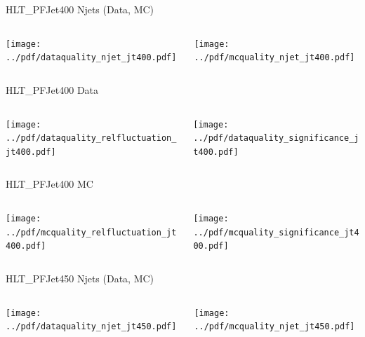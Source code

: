 \documentclass[9pt]{beamer}
\begin{document}
\begin{frame}[t]{HLT\_PFJet400 Njets (Data, MC)}
\begin{columns}[T]
  \begin{column}{.5\textwidth}
  \texttt{[image: ../pdf/dataquality\_njet\_jt400.pdf]}
  \end{column}
  \begin{column}{.5\textwidth}
  \texttt{[image: ../pdf/mcquality\_njet\_jt400.pdf]}
  \end{column}
\end{columns}
\end{frame}

\begin{frame}[t]{HLT\_PFJet400 Data}
\begin{columns}[T]
  \begin{column}{.5\textwidth}
  \texttt{[image: ../pdf/dataquality\_relfluctuation\_jt400.pdf]}
  \end{column}
  \begin{column}{.5\textwidth}
  \texttt{[image: ../pdf/dataquality\_significance\_jt400.pdf]}
  \end{column}
\end{columns}
\end{frame}

\begin{frame}[t]{HLT\_PFJet400 MC}
\begin{columns}[T]
  \begin{column}{.5\textwidth}
  \texttt{[image: ../pdf/mcquality\_relfluctuation\_jt400.pdf]}
  \end{column}
  \begin{column}{.5\textwidth}
  \texttt{[image: ../pdf/mcquality\_significance\_jt400.pdf]}
  \end{column}
\end{columns}
\end{frame}

\begin{frame}[t]{HLT\_PFJet450 Njets (Data, MC)}
\begin{columns}[T]
  \begin{column}{.5\textwidth}
  \texttt{[image: ../pdf/dataquality\_njet\_jt450.pdf]}
  \end{column}
  \begin{column}{.5\textwidth}
  \texttt{[image: ../pdf/mcquality\_njet\_jt450.pdf]}
  \end{column}
\end{columns}
\end{frame}
\end{document}
